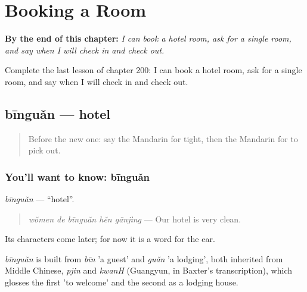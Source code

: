 
\chapter{Booking a Room}
\label{ch:zh-booking-a-room}

\begin{chapteropening}
\textbf{By the end of this chapter:} \emph{I can book a hotel room, ask for a single room, and say when I will check in and check out.}

Complete the last lesson of chapter 200: I can book a hotel room, ask for a single room, and say when I will check in and check out.
\end{chapteropening}

\section[bīnguǎn]{bīnguǎn — hotel}

\label{lesson:ZH-C200-binguan}



\begin{quote}
Before the new one: say the Mandarin for tight, then the Mandarin for to pick out.
\end{quote}

\subsection*{You'll want to know: bīnguǎn}
\emph{bīnguǎn} — \textquotedblleft{}hotel\textquotedblright{}.

\begin{quote}
\emph{wǒmen de bīnguǎn hěn gānjìng} — Our hotel is very clean.
\end{quote}

Its characters come later; for now it is a word for the ear.

\begin{cousinweb}
\emph{bīnguǎn} is built from \emph{bīn} 'a guest' and \emph{guǎn} 'a lodging', both inherited from Middle Chinese, \emph{pjin} and \emph{kwanH} (Guangyun, in Baxter's transcription), which glosses the first 'to welcome' and the second as a lodging house.
\end{cousinweb}

